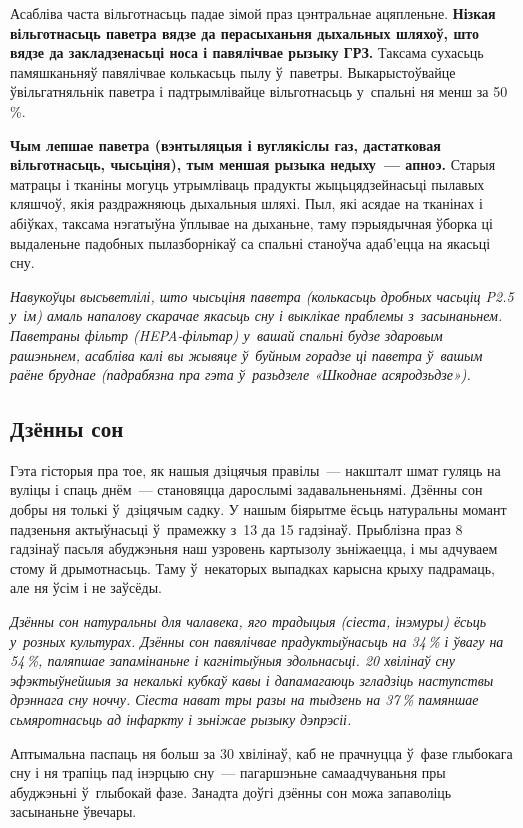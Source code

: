 Асабліва часта вільготнасьць падае зімой праз цэнтральнае ацяпленьне. \textbf{Нізкая вільготнасьць паветра вядзе да перасыханьня дыхальных шляхоў, што вядзе да закладзенасьці носа і павялічвае рызыку ГРЗ.} Таксама сухасьць памяшканьняў павялічвае колькасьць пылу ў~паветры. Выкарыстоўвайце ўвільгатняльнік паветра і падтрымлівайце вільготнасьць у~спальні ня менш за 50\,\%.

\textbf{Чым лепшае паветра (вэнтыляцыя і вуглякіслы газ, дастатковая вільготнасьць, чысьціня), тым меншая рызыка недыху~--- апноэ.} Старыя матрацы і тканіны могуць утрымліваць прадукты жыцьцядзейнасьці пылавых кляшчоў, якія раздражняюць дыхальныя шляхі. Пыл, які асядае на тканінах і абіўках, таксама нэгатыўна ўплывае на дыханьне, таму пэрыядычная ўборка ці выдаленьне падобных пылазборнікаў са спальні станоўча адаб'ецца на якасьці сну.

\emph{Навукоўцы высьветлілі, што чысьціня паветра (колькасьць дробных часьціц P2.5 у~ім) амаль напалову скарачае якасьць сну і выклікае праблемы з~засынаньнем. Паветраны фільтр (HEPA-фільтар) у~вашай спальні будзе здаровым рашэньнем, асабліва калі вы жывяце ў~буйным горадзе ці паветра ў~вашым раёне бруднае (падрабязна пра гэта ў~разьдзеле «Шкоднае асяродзьдзе»).}

\subsection*{Дзённы сон}

Гэта гісторыя пра тое, як нашыя дзіцячыя правілы~--- накшталт шмат гуляць на вуліцы і спаць днём~--- становяцца дарослымі задавальненьнямі. Дзённы сон добры ня толькі ў~дзіцячым садку. У нашым біярытме ёсьць натуральны момант падзеньня актыўнасьці ў~прамежку з~13 да 15 гадзінаў. Прыблізна праз 8 гадзінаў пасьля абуджэньня наш узровень картызолу зьніжаецца, і мы адчуваем стому й дрымотнасьць. Таму ў~некаторых выпадках карысна крыху падрамаць, але ня ўсім і не заўсёды.

\emph{Дзённы сон натуральны для чалавека, яго традыцыя (сіеста, інэмуры) ёсьць у~розных культурах. Дзённы сон павялічвае прадуктыўнасьць на 34\,\% і ўвагу на 54\,\%, паляпшае запамінаньне і кагнітыўныя здольнасьці. 20 хвілінаў сну эфэктыўнейшыя за некалькі кубкаў кавы і дапамагаюць згладзіць наступствы дрэннага сну ноччу. Сіеста нават тры разы на тыдзень на 37\,\% памяншае сьмяротнасьць ад інфаркту і зьніжае рызыку дэпрэсіі.}

Аптымальна паспаць ня больш за 30 хвілінаў, каб не прачнуцца ў~фазе глыбокага сну і ня трапіць пад інэрцыю сну~--- пагаршэньне самаадчуваньня пры абуджэньні ў~глыбокай фазе. Занадта доўгі дзённы сон можа запаволіць засынаньне ўвечары.

